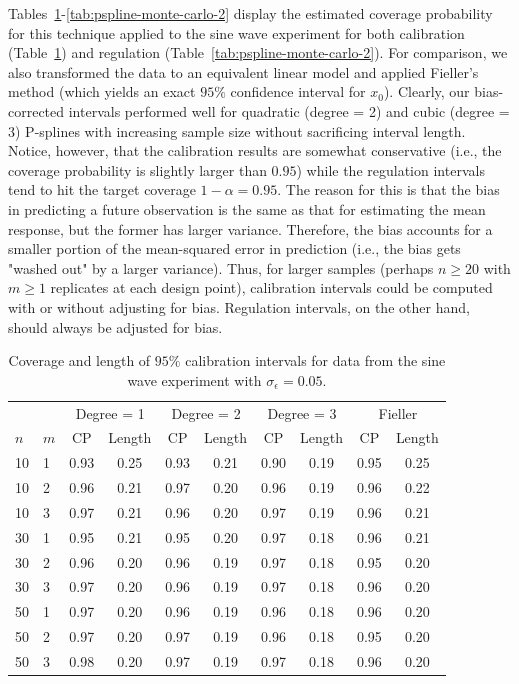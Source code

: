 \documentclass[cmfont,usenames,dvipsnames,leqno]{afit-etd}\usepackage[]{graphicx}\usepackage[]{color}
\begin{document}
Tables~\ref{tab:pspline-monte-carlo-1}-\ref{tab:pspline-monte-carlo-2} display the estimated coverage probability for this technique applied to the sine wave experiment for both calibration (Table~\ref{tab:pspline-monte-carlo-1}) and regulation (Table~\ref{tab:pspline-monte-carlo-2}). For comparison, we also transformed the data to an equivalent linear model and applied Fieller's method (which yields an exact $95\%$ confidence interval for $x_0$). Clearly, our bias-corrected intervals performed well for quadratic (degree = 2) and cubic (degree = 3) P-splines with increasing sample size without sacrificing interval length. Notice, however, that the calibration results are somewhat conservative (i.e., the coverage probability is slightly larger than $0.95$) while the regulation intervals tend to hit the target coverage $1-\alpha = 0.95$. The reason for this is that the bias in predicting a future observation is the same as that for estimating the mean response, but the former has larger variance. Therefore, the bias accounts for a smaller portion of the mean-squared error in prediction (i.e., the bias gets "washed out" by a larger variance). Thus, for larger samples (perhaps $n \ge 20$ with $m \ge 1$ replicates at each design point), calibration intervals could be computed with or without adjusting for bias. Regulation intervals, on the other hand, should always be adjusted for bias.




\begin{table}[H]%
\centering
  \begin{tabular}{llcccccccc}
  \toprule
  \phantom{abc} & \phantom{abc} & \multicolumn{2}{c}{Degree = 1} & \multicolumn{2}{c}{Degree = 2} & \multicolumn{2}{c}{Degree = 3} & \multicolumn{2}{c}{Fieller} \\
  \cline{3-10}
  $n$ & $m$ & CP & Length & CP & Length & CP & Length & CP & Length \\
  \hline
  10  &  1  & 0.93 & 0.25 & 0.93 & 0.21 & 0.90 & 0.19 & 0.95 & 0.25 \\
  10  &  2  & 0.96 & 0.21 & 0.97 & 0.20 & 0.96 & 0.19 & 0.96 & 0.22 \\
  10  &  3  & 0.97 & 0.21 & 0.96 & 0.20 & 0.97 & 0.19 & 0.96 & 0.21 \\
  \hline
  30  &  1  & 0.95 & 0.21 & 0.95 & 0.20 & 0.97 & 0.18 & 0.96 & 0.21 \\
  30  &  2  & 0.96 & 0.20 & 0.96 & 0.19 & 0.97 & 0.18 & 0.95 & 0.20 \\
  30  &  3  & 0.97 & 0.20 & 0.96 & 0.19 & 0.97 & 0.18 & 0.96 & 0.20 \\
  \hline
  50  &  1  & 0.97 & 0.20 & 0.96 & 0.19 & 0.96 & 0.18 & 0.96 & 0.20 \\
  50  &  2  & 0.97 & 0.20 & 0.97 & 0.19 & 0.96 & 0.18 & 0.95 & 0.20 \\
  50  &  3  & 0.98 & 0.20 & 0.97 & 0.19 & 0.97 & 0.18 & 0.96 & 0.20 \\
  \bottomrule
  \end{tabular}
\caption[Semiparametric calibration Monte Carlo simulation]{Coverage and length of $95\%$ calibration intervals for data from the sine wave experiment with $\sigma_\epsilon = 0.05$. \label{tab:pspline-monte-carlo-1}}
\end{table}
\end{document}
